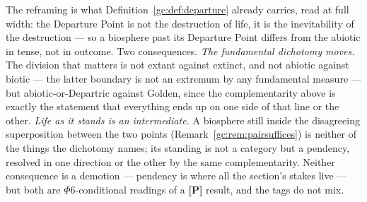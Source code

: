 \documentclass[11pt]{article}
\numberwithin{equation}{section}
\theoremstyle{plain}
\theoremstyle{definition}
\theoremstyle{remark}
\begin{document}
The reframing is what Definition~\ref{gc:def:departure} already carries, read at full width: the Departure Point is not the destruction of life, it is the inevitability of the destruction --- so a biosphere past its Departure Point differs from the abiotic in tense, not in outcome. Two consequences. \emph{The fundamental dichotomy moves.} The division that matters is not extant against extinct, and not abiotic against biotic --- the latter boundary is not an extremum by any fundamental measure --- but abiotic-or-Departric against Golden, since the complementarity above is exactly the statement that everything ends up on one side of that line or the other. \emph{Life as it stands is an intermediate.} A biosphere still inside the disagreeing superposition between the two points (Remark~\ref{gc:rem:pairsuffices}) is neither of the things the dichotomy names; its standing is not a category but a pendency, resolved in one direction or the other by the same complementarity. Neither consequence is a demotion --- pendency is where all the section's stakes live --- but both are $\Phi6$-conditional readings of a \textbf{[P]} result, and the tags do not mix.
\end{document}

